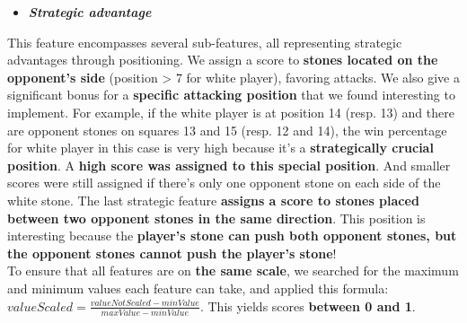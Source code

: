 \documentclass[11pt,a4paper]{report}
\begin{document}
\begin{answers}[21cm]
\begin{itemize}
    \item \textbf{\textit{Strategic advantage}}
\end{itemize}
This feature encompasses several sub-features, all representing strategic advantages through positioning. We assign a score to \textbf{stones located on the opponent's side} (position > 7 for white player), favoring attacks. We also give a significant bonus for a \textbf{specific attacking position} that we found interesting to implement. For example, if the white player is at position 14 (resp. 13) and there are opponent stones on squares 13 and 15 (resp. 12 and 14), the win percentage for white player in this case is very high because it's a \textbf{strategically crucial position}. A \textbf{high score was assigned to this special position}. And smaller scores were still assigned if there's only one opponent stone on each side of the white stone. The last strategic feature \textbf{assigns a score to stones placed between two opponent stones in the same direction}. This position is interesting because the \textbf{player's stone can push both opponent stones, but the opponent stones cannot push the player's stone}! \\

To ensure that all features are on \textbf{the same scale}, we searched for the maximum and minimum values each feature can take, and applied this formula: \textbf{$valueScaled = \frac{valueNotScaled - minValue}{maxValue - minValue}$}. This yields scores \textbf{between 0 and 1}.

\end{answers}
\end{document}
